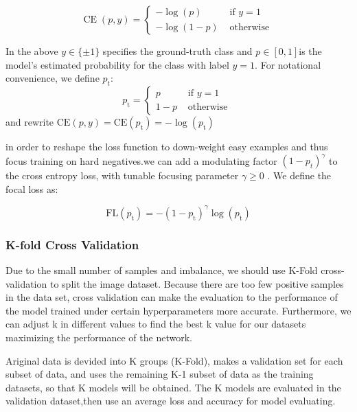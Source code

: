 \documentclass[12pt]{article}
\begin{document}
\begin{equation}
\operatorname{CE}(p, y)=\left\{\begin{array}{ll}
-\log (p) & \text { if } y=1 \\
-\log (1-p) & \text { otherwise }
\end{array}\right.
\end{equation}

In the above $y \in \{ \pm1 \}$ specifies the ground-truth class and
$p \in \left[ 0,1 \right]  $is the model’s estimated probability for the class
with label $y = 1$. For notational convenience, we define $p_t$:
\begin{equation}
p_{\mathrm{t}}=\left\{\begin{array}{ll}
p & \text { if } y=1 \\
1-p & \text { otherwise }
\end{array}\right.
\end{equation}
and rewrite $\mathrm{CE}(p, y)=\mathrm{CE}\left(p_{\mathrm{t}}\right)=-\log \left(p_{\mathrm{t}}\right)$

in order to reshape the loss function to down-weight easy examples and thus focus training on hard negatives.we can add a modulating factor
$(1 - p_t)^{\gamma}$ to the cross entropy loss, with tunable focusing parameter $\gamma \geq 0$ . We define the focal loss as:

\begin{equation}
\mathrm{FL}\left(p_{\mathrm{t}}\right)=-\left(1-p_{\mathrm{t}}\right)^{\gamma} \log \left(p_{\mathrm{t}}\right)
\end{equation}



\subsubsection{K-fold Cross Validation}
Due to the small number of samples and imbalance, we should use K-Fold cross-validation\cite{k_fold_cv} to split the image dataset. Because there are too few positive samples in the data set, cross validation can make the evaluation to the performance of the model trained under certain hyperparameters more accurate. Furthermore, we can adjust k in different values to find the best k value for our datasets maximizing the performance of the network. 

Ariginal data is devided into K groups (K-Fold), makes a validation set for each subset of data, and uses the remaining K-1 subset of data as the training datasets, so that K models will be obtained. The K models are evaluated in the validation dataset,then use an average loss and accuracy for model evaluating.
\end{document}
